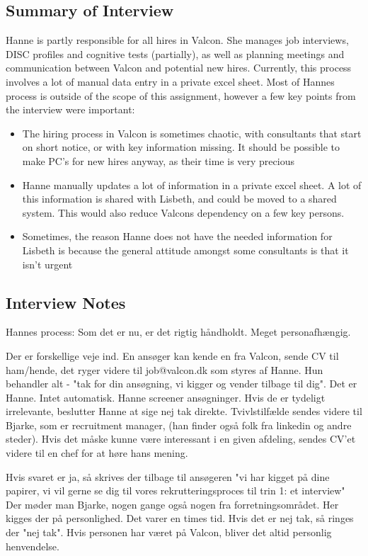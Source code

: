 \subsection{Summary of Interview}
Hanne is partly responsible for all hires in Valcon. She manages job interviews, DISC profiles and cognitive tests (partially), as well as planning meetings and communication between Valcon and potential new hires. \newline
Currently, this process involves a lot of manual data entry in a private excel sheet. 
Most of Hannes process is outside of the scope of this assignment, however a few key points from the interview were important:
\begin{itemize}
	\item{The hiring process in Valcon is sometimes chaotic, with consultants that start on short notice, or with key information missing. It should be possible to make PC's for new hires anyway, as their time is very precious}
	\item{Hanne manually updates a lot of information in a private excel sheet. A lot of this information is shared with Lisbeth, and could be moved to a shared system. This would also reduce Valcons dependency on a few key persons.}
	\item{Sometimes, the reason Hanne does not have the needed information for Lisbeth is because the general attitude amongst some consultants is that it isn't urgent}
\end{itemize}

\subsection{Interview Notes}
Hannes process:
Som det er nu, er det rigtig håndholdt. Meget personafhængig. 

Der er forskellige veje ind. En ansøger kan kende en fra Valcon, sende CV til ham/hende, det ryger videre til job@valcon.dk som styres af Hanne.
Hun behandler alt - "tak for din ansøgning, vi kigger og vender tilbage til dig". Det er Hanne. Intet automatisk.
Hanne screener ansøgninger. Hvis de er tydeligt irrelevante, beslutter Hanne at sige nej tak direkte. Tvivlstilfælde sendes videre til Bjarke, som er recruitment manager, (han finder også folk fra linkedin og andre steder).
Hvis det måske kunne være interessant i en given afdeling, sendes CV'et videre til en chef for at høre hans mening. 

Hvis svaret er ja, så skrives der tilbage til ansøgeren "vi har kigget på dine papirer, vi vil gerne se dig til vores rekrutteringsproces til trin 1: et interview" Der møder man Bjarke, nogen gange også nogen fra forretningsområdet.
Her kigges der på personlighed. Det varer en times tid.
Hvis det er nej tak, så ringes der "nej tak". Hvis personen har været på Valcon, bliver det altid personlig henvendelse.


